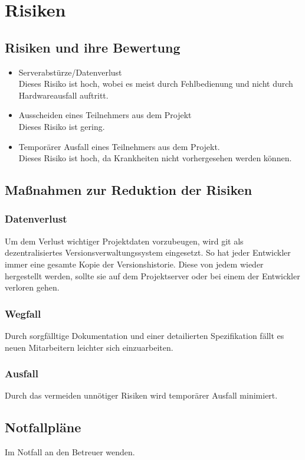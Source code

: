 \documentclass[a4paper,10pt]{scrartcl}
\begin{document}
\section{Risiken}
\subsection{Risiken und ihre Bewertung}
\begin{itemize}
\item Serverabstürze/Datenverlust\\
Dieses Risiko ist hoch, wobei es meist durch Fehlbedienung und nicht durch Hardwareausfall auftritt.
\item Ausscheiden eines Teilnehmers aus dem Projekt\\
Dieses Risiko ist gering.
\item Temporärer Ausfall eines Teilnehmers aus dem Projekt.\\
Dieses Risiko ist hoch, da Krankheiten nicht vorhergesehen werden können.
\end{itemize}


\subsection{Maßnahmen zur Reduktion der Risiken}
\subsubsection{Datenverlust}
Um dem Verlust wichtiger Projektdaten vorzubeugen, wird git als dezentralisiertes Versionsverwaltungssystem eingesetzt.
So hat jeder Entwickler immer eine gesamte Kopie der Versionshistorie. Diese von jedem wieder hergestellt werden, sollte sie auf dem Projektserver oder bei einem der Entwickler verloren gehen.
\subsubsection{Wegfall}
Durch sorgfälltige Dokumentation und einer detailierten Spezifikation fällt es neuen Mitarbeitern leichter sich einzuarbeiten.
\subsubsection{Ausfall}
Durch das vermeiden unnötiger Risiken wird temporärer Ausfall minimiert.
\subsection{Notfallpläne}
Im Notfall an den Betreuer wenden.
\end{document}
